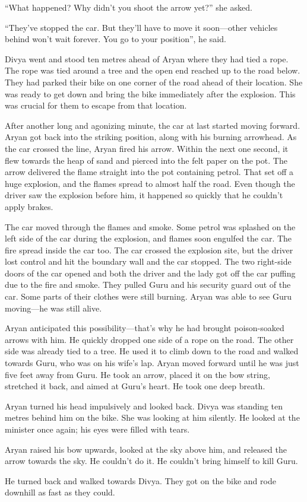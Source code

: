 “What happened? Why didn't you shoot the arrow yet?” she asked.

“They've stopped the car. But they'll have to move it soon—other vehicles
behind won't wait forever. You go to your position”, he said.

Divya went and stood ten metres ahead of Aryan where they had tied a rope. The
rope was tied around a tree and the open end reached up to the road below. They
had parked their bike on one corner of the road ahead of their location. She was
ready to get down and bring the bike immediately after the explosion. This was
crucial for them to escape from that location.

After another long and agonizing minute, the car at last started moving forward.
Aryan got back into the striking position, along with his burning arrowhead. As the
car crossed the line, Aryan fired his arrow. Within the next one second, it flew
towards the heap of sand and pierced into the felt paper on the pot. The arrow
delivered the flame straight into the pot containing petrol. That set off a
huge explosion, and the flames spread to almost half the road. Even though the
driver saw the explosion before him, it happened so quickly that he couldn't
apply brakes.

The car moved through the flames and smoke. Some petrol was splashed
on the left side of the car during the explosion, and flames soon engulfed the
car. The fire spread inside the car too. The car crossed the explosion site, but
the driver lost control and hit the boundary wall and the car stopped. The two
right-side doors of the car opened and both the driver and the lady got off the
car puffing due to the fire and smoke. They pulled Guru and his security guard out
of the car. Some parts of their clothes were still burning. Aryan was able to
see Guru moving—he was still alive.

Aryan anticipated this possibility—that's why he had brought poison-soaked
arrows with him. He quickly dropped one side of a rope on the road. The other
side was already tied to a tree. He used it to climb down to the road and walked
towards Guru, who was on his wife's lap. Aryan moved forward until he was just
five feet away from Guru. He took an arrow, placed it on the bow string,
stretched it back, and aimed at Guru's heart. He took one deep breath.

Aryan turned his head impulsively and looked back. Divya was standing ten metres
behind him on the bike. She was looking at him silently. He looked at the
minister once again; his eyes were filled with tears.

Aryan raised his bow upwards, looked at the sky above him, and released the
arrow towards the sky. He couldn't do it. He couldn't bring himself to kill
Guru.

He turned back and walked towards Divya. They got on the bike and rode downhill
as fast as they could.